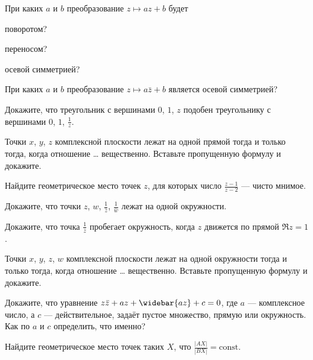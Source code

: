 \documentclass[a4paper, 12pt, num=23, date=09.10.2019]{listok}
\begin{document}
\begin{problem}
	При каких $a$ и $b$ преобразование $z \mapsto az + b$ будет
	\begin{probparts}
		\item поворотом?
		\item переносом?
		\item осевой симметрией?
	\end{probparts}
\end{problem}
\begin{problem}
	При каких $a$ и $b$ преобразование $z \mapsto a\bar z + b$ является осевой симметрией?
\end{problem}
\begin{problem}
	Докажите, что треугольник с вершинами $0$, $1$, $z$ подобен треугольнику с вершинами $0$, $1$, $\frac1z$.
\end{problem}
\begin{problem}
	Точки $x$, $y$, $z$ комплексной плоскости лежат на одной прямой тогда и только тогда, когда отношение \ldots{} вещественно. Вставьте пропущенную формулу и докажите.
\end{problem}
\begin{problem}
	Найдите геометрическое место точек $z$, для которых число $\frac{z-1}{z-2}$ --- чисто мнимое.
\end{problem}
\begin{problem}
	Докажите, что точки $z$, $w$, $\frac1{\bar z}$, $\frac1{\bar w}$ лежат на одной окружности.
\end{problem}
\begin{problem}
	Докажите, что точка $\frac1{\bar z}$ пробегает окружность, когда $z$ движется по прямой $\Re z = 1$.
\end{problem}
\begin{problem}
	Точки $x$, $y$, $z$, $w$ комплексной плоскости лежат на одной окружности тогда и только тогда, когда отношение \ldots{} вещественно.
	Вставьте пропущенную формулу и докажите.
\end{problem}
\begin{problem}
	Докажите, что уравнение $z\bar z + az + \widebar{az} + c = 0$, где $a$ --- комплексное число,
	а $c$ --- действительное, задаёт пустое множество, прямую или окружность. Как по $a$ и $c$ определить, что именно?
\end{problem}
\begin{problem}
	Найдите геометрическое место точек таких $X$, что $\frac{|AX|}{|BX|} = \mathrm{const}$.
\end{problem}
\end{document}
